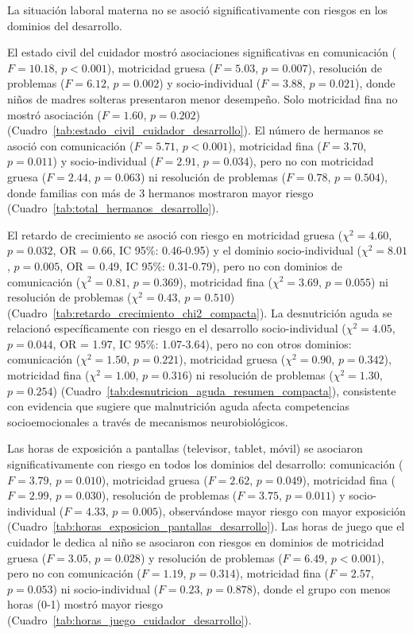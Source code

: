 \documentclass[11pt,letterpaper]{report}
\begin{document}
La situación laboral materna no se asoció significativamente con riesgos en los
dominios del desarrollo.

El estado civil del cuidador mostró asociaciones significativas en comunicación 
($F = 10.18$, $p < 0.001$), motricidad gruesa ($F = 5.03$, $p = 0.007$), 
resolución de problemas ($F = 6.12$, $p = 0.002$) y socio-individual 
($F = 3.88$, $p = 0.021$), donde niños de madres solteras presentaron 
menor desempeño. Solo motricidad fina no mostró asociación ($F = 1.60$, 
$p = 0.202$) (Cuadro~\ref{tab:estado_civil_cuidador_desarrollo}). El número 
de hermanos se asoció con comunicación ($F = 5.71$, $p < 0.001$), motricidad 
fina ($F = 3.70$, $p = 0.011$) y socio-individual ($F = 2.91$, $p = 0.034$), 
pero no con motricidad gruesa ($F = 2.44$, $p = 0.063$) ni resolución de 
problemas ($F = 0.78$, $p = 0.504$), donde familias con más de 3 hermanos 
mostraron mayor riesgo (Cuadro~\ref{tab:total_hermanos_desarrollo}).

El retardo de crecimiento se asoció con riesgo en motricidad gruesa
($\chi^2 = 4.60$, $p = 0.032$, OR = 0.66, IC 95\%: 0.46-0.95) y el dominio
socio-individual ($\chi^2 = 8.01$, $p = 0.005$, OR = 0.49, IC 95\%: 0.31-0.79),
pero no con dominios de comunicación ($\chi^2 = 0.81$, $p = 0.369$), motricidad
fina ($\chi^2 = 3.69$, $p = 0.055$) ni resolución de problemas ($\chi^2 = 0.43$, $p = 0.510$) 
(Cuadro~\ref{tab:retardo_crecimiento_chi2_compacta}). La desnutrición aguda 
se relacionó específicamente con riesgo en el desarrollo socio-individual
($\chi^2 = 4.05$, $p = 0.044$, OR = 1.97, IC 95\%: 1.07-3.64), pero no con otros
dominios:  comunicación ($\chi^2 = 1.50$, $p = 0.221$), motricidad gruesa 
($\chi^2 = 0.90$, $p = 0.342$), motricidad fina ($\chi^2 = 1.00$, $p = 0.316$) 
ni resolución de problemas ($\chi^2 = 1.30$, $p = 0.254$) 
(Cuadro~\ref{tab:desnutricion_aguda_resumen_compacta}), consistente con 
evidencia que sugiere que malnutrición aguda afecta competencias 
socioemocionales a través de mecanismos neurobiológicos.

Las horas de exposición a pantallas (televisor, tablet, móvil) se asociaron
significativamente con riesgo en todos los dominios del desarrollo: comunicación
($F = 3.79$, $p = 0.010$), motricidad gruesa ($F = 2.62$, $p = 0.049$),
motricidad fina ($F = 2.99$, $p = 0.030$), resolución de problemas ($F = 3.75$,
$p = 0.011$) y  socio-individual ($F = 4.33$, $p = 0.005$), observándose mayor
riesgo con mayor exposición (Cuadro~\ref{tab:horas_exposicion_pantallas_desarrollo}). 
Las horas de juego que el cuidador le dedica al niño se asociaron con riesgos en
dominios de motricidad gruesa ($F = 3.05$, $p = 0.028$) y resolución de
problemas ($F = 6.49$, $p < 0.001$), pero no con comunicación ($F = 1.19$,
$p = 0.314$), motricidad fina ($F = 2.57$, $p = 0.053$) ni socio-individual
($F = 0.23$, $p = 0.878$), donde el grupo con menos horas (0-1) mostró mayor
riesgo (Cuadro~\ref{tab:horas_juego_cuidador_desarrollo}).
\end{document}
